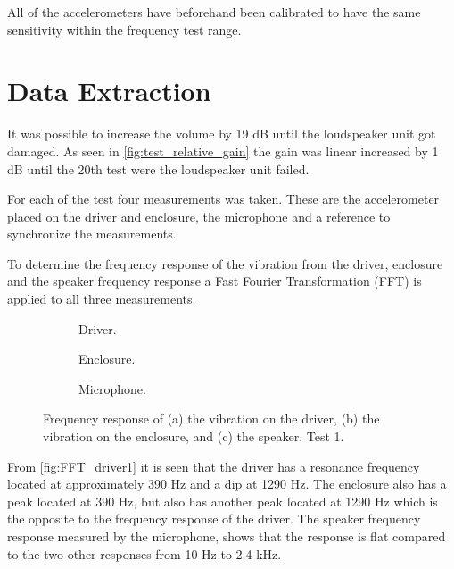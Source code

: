 All of the accelerometers have beforehand been calibrated to have the same sensitivity within the frequency test range.


\section{Data Extraction}

It was possible to increase the volume by 19 dB until the loudspeaker unit got damaged. As seen in \autoref{fig:test_relative_gain} the gain was linear increased by 1 dB until the 20th test were the loudspeaker unit failed.

\begin{figure}[H]
\centering
{}

\caption{}
\label{fig:test_relative_gain}
\end{figure}

For each of the test four measurements was taken. These are the accelerometer placed on the driver and enclosure, the microphone and a reference to synchronize the measurements. 


To determine the frequency response of the vibration from the driver, enclosure and the speaker frequency response a Fast Fourier Transformation (FFT) is applied to all three measurements.

\begin{figure}[H]
\centering
\begin{subfigure}[t]{0.37\textwidth}
	
	\caption{Driver.}
	\label{fig:FFT_driver1}
\end{subfigure}
\begin{subfigure}[t]{0.28\textwidth}
	
	\caption{Enclosure.}
	\label{fig:FFT_enclosure1}
\end{subfigure}
\begin{subfigure}[t]{0.32\textwidth}
	
	\caption{Microphone.}
	\label{fig:FFT_mic1}
\end{subfigure}
\caption{Frequency response of (a) the vibration on the driver, (b) the vibration on the enclosure, and (c) the speaker. Test 1.}
\label{fig:FFT1}
\end{figure}

From \autoref{fig:FFT_driver1} it is seen that the driver has a resonance frequency located at approximately 390 Hz and a dip at 1290 Hz. The enclosure also has a peak located at 390 Hz, but also has another peak located at 1290 Hz which is the opposite to the frequency response of the driver. The speaker frequency response measured by the microphone, shows that the response is flat compared to the two other responses from 10 Hz to 2.4 kHz.

